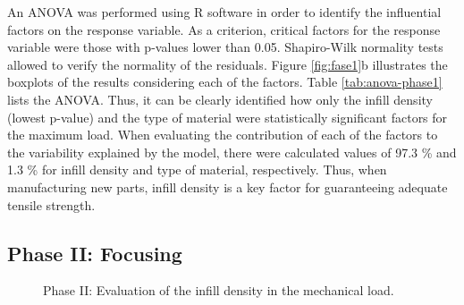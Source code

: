 \documentclass[
  12pt]{article}
\begin{document}
An ANOVA was performed using R software in order to identify the influential factors on the response variable.
As a criterion, critical factors for the response variable were those with p-values lower than 0.05.
Shapiro-Wilk normality tests allowed to verify the normality of the residuals.
Figure \ref{fig:fase1}b illustrates the boxplots of the results considering each of the factors.
Table \ref{tab:anova-phase1} lists the ANOVA.
Thus, it can be clearly identified how only the infill density (lowest p-value) and the type of material were statistically significant factors for the maximum load.
When evaluating the contribution of each of the factors to the variability explained by the model, there were calculated values of 97.3 \% and 1.3 \% for infill density and type of material, respectively. Thus, when manufacturing new parts, infill density is a key factor for guaranteeing adequate tensile strength.

\hypertarget{phase-ii-focusing}{%
\subsection{Phase II: Focusing}\label{phase-ii-focusing}}

\begin{figure}[!h]

{\centering {}

}

\caption{Phase II: Evaluation of the infill density in the mechanical load.}\label{fig:phase2}
\end{figure}
\end{document}
